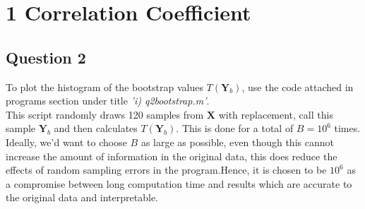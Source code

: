 \documentclass[10pt]{article}
\begin{document}
\newpage
\section*{1 Correlation Coefficient}
\subsection*{Question 2}
To plot the histogram of the bootstrap values $T(\mathbf{Y}_b)$, use the code attached in programs section under title \textit{'i) q2\textunderscore bootstrap.m'}.\\
This script randomly draws 120 samples from $\mathbf{X}$ with replacement, call this sample $\mathbf{Y}_b$ and then calculates $T(\mathbf{Y}_b)$. This is done for a total of $B=10^6$ times.\\
Ideally, we'd want to choose $B$ as large as possible, even though this cannot increase the amount of information in the original data, this does reduce the effects of random sampling errors in the program.Hence, it is chosen to be $10^6$ as a compromise between long computation time and results which are accurate to the original data and interpretable.\\ 
\end{document}
